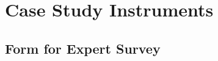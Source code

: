 \chapter{Case Study Instruments}
\label{ap:measurement-instruments}


\def \tick{
$[$\hspace{0.3cm}$]$
}

\def \twooption#1#2{
\tick #1.  \tick #2.
}

\def \threeoption#1#2#3{
\tick #1.\newline
\tick #2.\newline
\tick #3.
}

\def \fouroption#1#2#3#4{
\tick #1.\newline
\tick #2.\newline
\tick #3.\newline
\tick #4.
}

\def \fiveoption#1#2#3#4#5{
\tick #1.\newline
\tick #2.\newline
\tick #3.\newline
\tick #4.\newline
\tick #5.
}
\def \datefield{
    /\hspace{0.4cm}/
}

\def \rcolor{
    \rowcolor[gray]{0.9}
}

\def \hcolor{
    \rowcolor[gray]{0.7}
}


\section{Form for Expert Survey}
\label{ap:sec:feedback}

